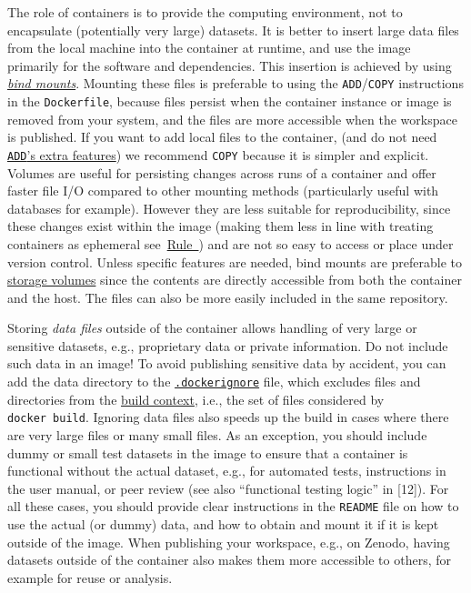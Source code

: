 \documentclass[10pt,letterpaper]{article}
\begin{document}
The role of containers is to provide the computing environment, not to
encapsulate (potentially very large) datasets. It is better to insert
large data files from the local machine into the container at runtime,
and use the image primarily for the software and dependencies. This
insertion is achieved by using
\href{https://docs.docker.com/storage/bind-mounts/}{\emph{bind mounts}}.
Mounting these files is preferable to using the
\texttt{ADD}/\texttt{COPY} instructions in the \texttt{Dockerfile},
because files persist when the container instance or image is removed
from your system, and the files are more accessible when the workspace
is published. If you want to add local files to the container, (and do
not need
\href{https://docs.docker.com/engine/reference/builder/\#add}{\texttt{ADD}'s
extra features}) we recommend \texttt{COPY} because it is simpler and
explicit. Volumes are useful for persisting changes across runs of a
container and offer faster file I/O compared to other mounting methods
(particularly useful with databases for example). However they are less
suitable for reproducibility, since these changes exist within the image
(making them less in line with treating containers as ephemeral
see~\hyperref[{rule:usage}]{Rule~}) and are not so
easy to access or place under version control. Unless specific features
are needed, bind mounts are preferable to
\href{https://docs.docker.com/storage/volumes/}{storage volumes} since
the contents are directly accessible from both the container and the
host. The files can also be more easily included in the same repository.

Storing \emph{data files} outside of the container allows handling of
very large or sensitive datasets, e.g., proprietary data or private
information. Do not include such data in an image! To avoid publishing
sensitive data by accident, you can add the data directory to the
\href{https://docs.docker.com/engine/reference/commandline/build/\#use-a-dockerignore-file}{\texttt{.dockerignore}}
file, which excludes files and directories from the
\href{https://docs.docker.com/engine/reference/commandline/build/\#extended-description}{build
context}, i.e., the set of files considered by \texttt{docker\ build}.
Ignoring data files also speeds up the build in cases where there are
very large files or many small files. As an exception, you should
include dummy or small test datasets in the image to ensure that a
container is functional without the actual dataset, e.g., for automated
tests, instructions in the user manual, or peer review (see also
``functional testing logic'' in {[}12{]}). For all these cases, you
should provide clear instructions in the \texttt{README} file on how to
use the actual (or dummy) data, and how to obtain and mount it if it is
kept outside of the image. When publishing your workspace, e.g., on
Zenodo, having datasets outside of the container also makes them more
accessible to others, for example for reuse or analysis.
\end{document}

